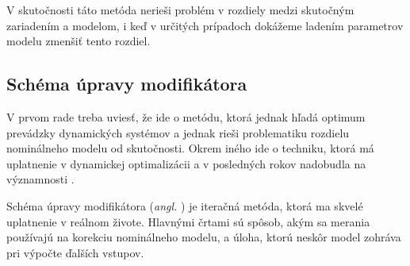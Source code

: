 V skutočnosti táto metóda nerieši problém v rozdiely medzi skutočným zariadením a modelom, i keď v určitých prípadoch dokážeme ladením parametrov modelu zmenšiť tento rozdiel.

\subsection{Schéma úpravy modifikátora}
V prvom rade treba uviesť, že ide o metódu, ktorá jednak hľadá optimum prevádzky dynamických systémov a jednak rieši problematiku rozdielu nominálneho modelu od skutočnosti. Okrem iného ide o techniku, ktorá má uplatnenie v dynamickej optimalizácii a
v posledných rokov nadobudla na významnosti \cite{marchetti:modifier_adapt_scheme:2020}.

Schéma úpravy modifikátora (\textit{angl. }) je iteračná metóda, ktorá ma skvelé uplatnenie v reálnom živote. Hlavnými črtami sú spôsob, akým sa merania používajú na korekciu nominálneho modelu, a úloha, ktorú neskôr model zohráva pri výpočte ďalších vstupov.

